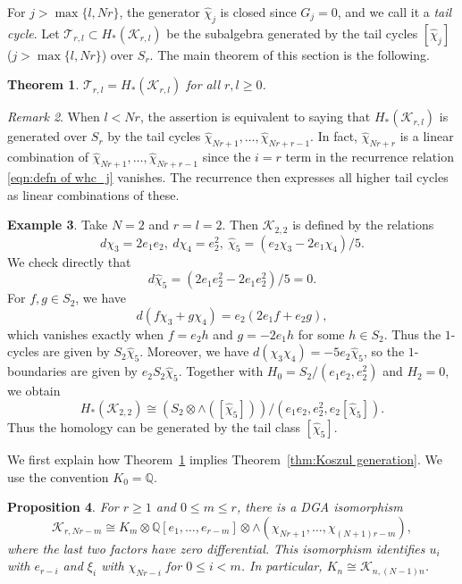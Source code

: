\documentclass[reqno]{amsart}
\newtheorem{thm}{Theorem}[section]
\newtheorem{prop}[thm]{Proposition}
\theoremstyle{definition}
\newtheorem{exmp}[thm]{Example}
\theoremstyle{remark}
\newtheorem{rem}[thm]{Remark}
\newcommand{\QQ}{\mathbb{Q}}
\newcommand{\cat}{\mathcal{T}}
\newcommand{\cak}{\mathcal{K}}
\newcommand{\whc}{\widehat{\chi}}
\begin{document}
For $j>\max\{l,Nr\}$, the generator $\whc_j$ is closed since $G_j=0$, and we call it a \emph{tail cycle}. Let $\cat_{r,l}\subset H_*(\cak_{r,l})$ be the subalgebra generated by the tail cycles $[\whc_j]$ ($j>\max\{l,Nr\}$) over $S_r$. The main theorem of this section is the following.

\begin{thm}\label{thm:2 parameter Koszul generation}
  $\cat_{r,l}=H_*(\cak_{r,l})$ for all $r,l\ge 0$.
\end{thm}


\begin{rem}When $l<Nr$, the assertion is equivalent to saying that $H_*(\cak_{r,l})$ is generated over $S_r$ by the tail cycles $\whc_{Nr+1},\dots,\whc_{Nr+r-1}$. In fact, $\whc_{Nr+r}$ is a linear combination of $\whc_{Nr+1},\dots,\whc_{Nr+r-1}$ since the $i=r$ term in the recurrence relation \eqref{eqn:defn of whc_j} vanishes. The recurrence then expresses all higher tail cycles as linear combinations of these.
\end{rem}

\begin{exmp}
Take $N=2$ and $r=l=2$. Then $\cak_{2,2}$ is defined by the relations
\[d\chi_3=2e_1e_2,\ d\chi_4=e_2^2,\ \whc_5=(e_2\chi_3-2e_1\chi_4)/5.\]
We check directly that
\[d\whc_5=(2e_1e_2^2-2e_1e_2^2)/5=0.\]
For $f,g\in S_2$, we have
\[d(f\chi_3+g\chi_4)=e_2(2e_1f+e_2g),\]
which vanishes exactly when $f=e_2h$ and $g=-2e_1h$ for some $h\in S_2$. Thus the $1$-cycles are given by $S_2\whc_5$. Moreover, we have $d(\chi_3\chi_4)=-5e_2\whc_5$, so the $1$-boundaries are given by $e_2S_2\whc_5$. Together with $H_0=S_2/(e_1e_2,e_2^2)$ and $H_2=0$, we obtain
\[H_*(\cak_{2,2})\cong(S_2\otimes\wedge([\whc_5]))/(e_1e_2,e_2^2,e_2[\whc_5]).\]
Thus the homology can be generated by the tail class $[\whc_5]$.
\end{exmp}




We first explain how Theorem~\ref{thm:2 parameter Koszul generation} implies Theorem~\ref{thm:Koszul generation}. We use the convention $K_0=\QQ$.

\begin{prop}\label{prop:Krl in terms of Km}
For $r\ge1$ and $0\le m\le r$, there is a DGA isomorphism
\[
\cak_{r,Nr-m}\cong K_m\otimes\QQ[e_1,\dots,e_{r-m}]\otimes\wedge(\chi_{Nr+1},\dots,\chi_{(N+1)r-m}),
\]
where the last two factors have zero differential. This isomorphism identifies
$u_i$ with $e_{r-i}$ and $\xi_i$ with $\chi_{Nr-i}$ for $0\le i<m$.
In particular, $K_n\cong\cak_{n,(N-1)n}$.
\end{prop}
\end{document}

